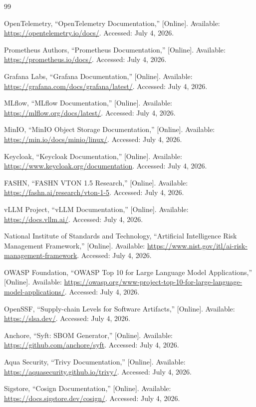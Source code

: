 \documentclass[12pt,a4paper,oneside]{report}
\begin{document}
\begin{thebibliography}{99}

OpenTelemetry, ``OpenTelemetry Documentation,'' [Online]. Available:
\url{https://opentelemetry.io/docs/}. Accessed: July 4, 2026.

Prometheus Authors, ``Prometheus Documentation,'' [Online]. Available:
\url{https://prometheus.io/docs/}. Accessed: July 4, 2026.

Grafana Labs, ``Grafana Documentation,'' [Online]. Available:
\url{https://grafana.com/docs/grafana/latest/}. Accessed: July 4, 2026.

MLflow, ``MLflow Documentation,'' [Online]. Available:
\url{https://mlflow.org/docs/latest/}. Accessed: July 4, 2026.

MinIO, ``MinIO Object Storage Documentation,'' [Online]. Available:
\url{https://min.io/docs/minio/linux/}. Accessed: July 4, 2026.

Keycloak, ``Keycloak Documentation,'' [Online]. Available:
\url{https://www.keycloak.org/documentation}. Accessed: July 4, 2026.

FASHN, ``FASHN VTON 1.5 Research,'' [Online]. Available:
\url{https://fashn.ai/research/vton-1-5}. Accessed: July 4, 2026.

vLLM Project, ``vLLM Documentation,'' [Online]. Available:
\url{https://docs.vllm.ai/}. Accessed: July 4, 2026.

National Institute of Standards and Technology, ``Artificial Intelligence Risk
Management Framework,'' [Online]. Available:
\url{https://www.nist.gov/itl/ai-risk-management-framework}. Accessed:
July 4, 2026.

OWASP Foundation, ``OWASP Top 10 for Large Language Model Applications,''
[Online]. Available:
\url{https://owasp.org/www-project-top-10-for-large-language-model-applications/}.
Accessed: July 4, 2026.

OpenSSF, ``Supply-chain Levels for Software Artifacts,'' [Online]. Available:
\url{https://slsa.dev/}. Accessed: July 4, 2026.

Anchore, ``Syft: SBOM Generator,'' [Online]. Available:
\url{https://github.com/anchore/syft}. Accessed: July 4, 2026.

Aqua Security, ``Trivy Documentation,'' [Online]. Available:
\url{https://aquasecurity.github.io/trivy/}. Accessed: July 4, 2026.

Sigstore, ``Cosign Documentation,'' [Online]. Available:
\url{https://docs.sigstore.dev/cosign/}. Accessed: July 4, 2026.

\end{thebibliography}
\end{document}
